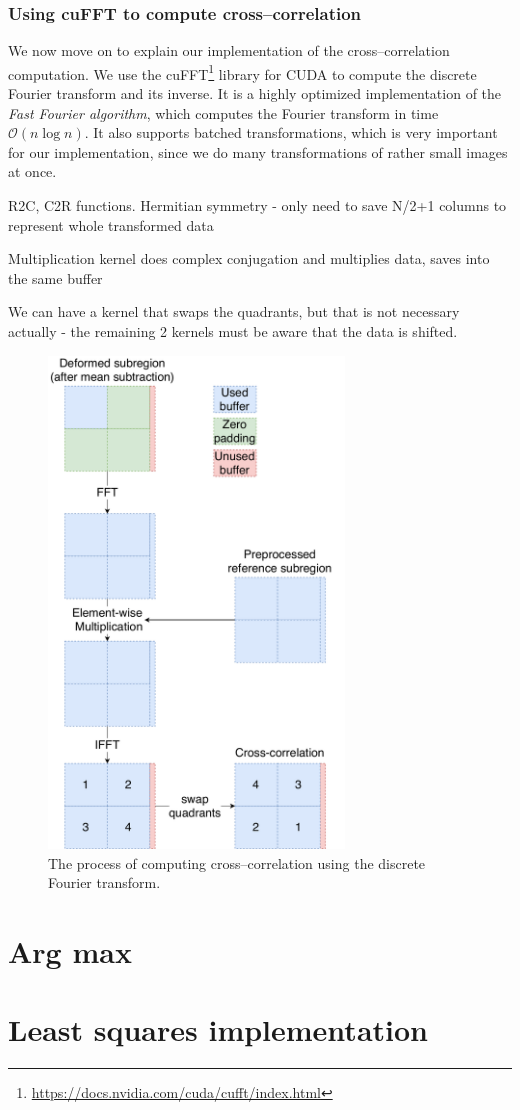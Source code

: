 \subsubsection{Using cuFFT to compute cross--correlation}
We now move on to explain our implementation of the cross--correlation computation. We use the cuFFT\footnote{\url{https://docs.nvidia.com/cuda/cufft/index.html}} library for CUDA to compute the discrete Fourier transform and its inverse. It is a highly optimized implementation of the \emph{Fast Fourier algorithm}, which computes the Fourier transform in time $\mathcal{O}(n \log n)$. It also supports batched transformations, which is very important for our implementation, since we do many transformations of rather small images at once.  

R2C, C2R functions. Hermitian symmetry - only need to save N/2+1 columns to represent whole transformed data

Multiplication kernel does complex conjugation and multiplies data, saves into the same buffer

We can have a kernel that swaps the quadrants, but that is not necessary actually - the remaining 2 kernels must be aware that the data is shifted.

\begin{figure}
	\centering
	\includegraphics[width=0.7\textwidth]{img/fft-impl}
	\caption{The process of computing cross--correlation using the discrete Fourier transform.}
	\label{fft-impl}
\end{figure}

\section{Arg max}



\section{Least squares implementation}